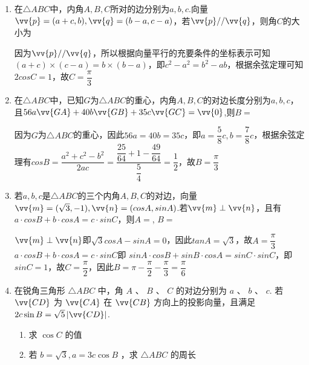 \begin{enumerate}
\begin{enumerate}
        \item 在$\triangle ABC$中，内角$A, B, C$所对的边分别为$a, b, c$.向量$\vv{p} = (a+c, b), \vv{q} = (b-a, c-a)$，若$\vv{p} // \vv{q}$，则角$C$的大小为
        \begin{jieda}
            因为$\vv{p} // \vv{q}$，所以根据向量平行的充要条件的坐标表示可知$(a+c) \times (c-a) = b \times (b-a)$，即$c^2 - a^2 = b^2 - ab$，根据余弦定理可知$2cosC = 1$，故$C = \dfrac{\pi}{3}$
        \end{jieda}
        \item 在$\triangle ABC$中，已知$G$为$\triangle ABC$的重心，内角$A,B,C$的对边长度分别为$a, b, c$，且$56a \vv{GA} + 40b \vv{GB} + 35c\vv{GC} = \vv{0}$,则$B = $
        \begin{jieda}
            因为$G$为$\triangle ABC$的重心，因此$56a = 40 b = 35c$，即$a = \dfrac{5}{8}c, b = \dfrac{7}{8}c$，根据余弦定理有$cosB = \dfrac{a^2 + c^2 - b^2}{2ac} = \dfrac{\dfrac{25}{64} + 1 - \dfrac{49}{64}}{\dfrac{5}{4}} = \dfrac{1}{2}$，故$B = \dfrac{\pi}{3}$
        \end{jieda}
        \item 若$a, b, c$是$\triangle ABC$的三个内角$A, B, C$的对边，向量$\vv{m} = (\sqrt{3}, -1), \vv{n} = (cosA, sinA)$.若$\vv{m} \perp \vv{n}$，且有$a\cdot cosB + b \cdot cosA = c \cdot sinC$，则$A = $, $B = $
        \begin{jieda}
            $\vv{m} \perp \vv{n}$即$\sqrt{3}cosA - sinA  = 0$，因此$tanA = \sqrt{3}$，故$A = \dfrac{\pi}{3}$ \\
            $a\cdot cosB + b \cdot cosA = c \cdot sinC$即
            $sinA \cdot cosB + sinB \cdot cosA = sinC \cdot sinC$，即$sinC = 1$，故$C = \dfrac{\pi}{2}$，因此$B = \pi - \dfrac{\pi}{2} - \dfrac{\pi}{3} = \dfrac{\pi}{6}$
        \end{jieda}
        \item 在锐角三角形 $\bigtriangleup  {ABC}$ 中，角 $A$ 、 $B$ 、 $C$ 的对边分别为 $a$ 、 $b$ 、 $c$. 若 $\vv{CD}$ 为 $\vv{CA}$ 在 $\vv{CB}$ 方向上的投影向量，且满足 ${2c}\sin B = \sqrt{5}\left| \vv{CD}\right|$.
        \begin{enumerate}
            \item 求 $\cos C$ 的值
            \item 若 $b = \sqrt{3},a = {3c}\cos B$ ，求 $\bigtriangleup  {ABC}$ 的周长
        \end{enumerate}
        \begin{jieda}

\end{jieda}
\end{enumerate}
\end{enumerate}
